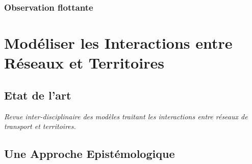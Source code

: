 \subsubsection{Observation flottante}






\section{Modéliser les Interactions entre Réseaux et Territoires}


\subsection{Etat de l'art}

\textit{Revue inter-disciplinaire des modèles traitant les interactions entre réseaux de transport et territoires.}


\subsection{Une Approche Epistémologique}









